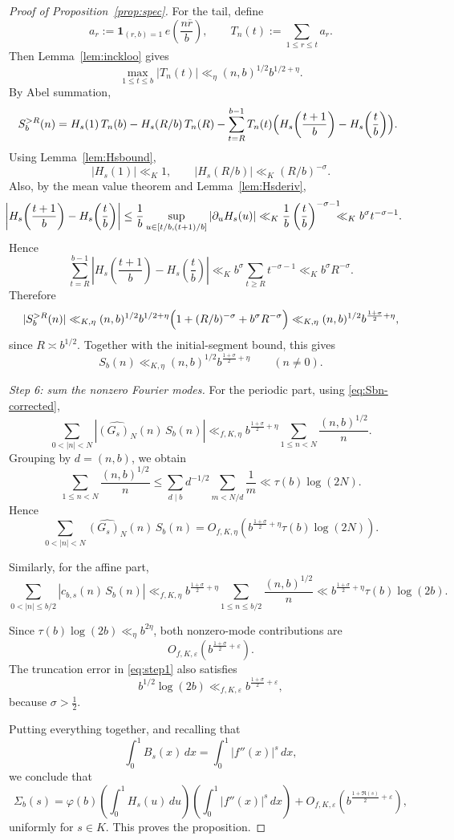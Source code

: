 \documentclass[a4paper,american,11pt]{amsart}
\theoremstyle{plain}
\theoremstyle{definition}
\newcommand{\ind}{\mathbf 1}
\begin{document}
\begin{proof}[Proof of Proposition~\ref{prop:spec}]
For the tail, define
\[
a_r:=\ind_{(r,b)=1}\,e\!\left(\frac{n\overline r}{b}\right),
\qquad
T_n(t):=\sum_{1\le r\le t} a_r.
\]
Then Lemma~\ref{lem:inckloo} gives
\[
\max_{1\le t\le b}|T_n(t)|
\ll_\eta (n,b)^{1/2}b^{1/2+\eta}.
\]
By Abel summation,
\[\mkern-10mu
S_b^{>R}(n)
=
H_s(1)\,T_n(b)-H_s(R/b)\,T_n(R)
-\sum_{t=R}^{b-1}T_n(t)\Bigl(H_s\!\left(\frac{t+1}{b}\right)-H_s\!\left(\frac{t}{b}\right)\Bigr).
\]
Using Lemma~\ref{lem:Hsbound},
\[
|H_s(1)|\ll_K1,
\qquad
|H_s(R/b)|\ll_K (R/b)^{-\sigma}.
\]
Also, by the mean value theorem and Lemma~\ref{lem:Hsderiv},
\[\mkern-22mu
\left|H_s\!\left(\frac{t+1}{b}\right)-H_s\!\left(\frac{t}{b}\right)\right|
\le
\frac1b\sup_{u\in[t/b,(t+1)/b]}|\partial_u H_s(u)|
\ll_K
\frac1b\left(\frac{t}{b}\right)^{-\sigma-1}
\mkern-12mu\ll_K b^\sigma t^{-\sigma-1}.
\]
Hence
\[
\sum_{t=R}^{b-1}
\left|H_s\!\left(\frac{t+1}{b}\right)-H_s\!\left(\frac{t}{b}\right)\right|
\ll_K
b^\sigma\sum_{t\ge R}t^{-\sigma-1}
\ll_K b^\sigma R^{-\sigma}.
\]
Therefore
\[
|S_b^{>R}(n)|
\ll_{K,\eta}
(n,b)^{1/2}b^{1/2+\eta}\Bigl(1+(R/b)^{-\sigma}+b^\sigma R^{-\sigma}\Bigr)
\ll_{K,\eta}
(n,b)^{1/2}b^{\frac{1+\sigma}{2}+\eta},
\]
since \(R\asymp b^{1/2}\). Together with the initial-segment bound, this gives
\begin{equation}
\label{eq:Sbn-corrected}
S_b(n)\ll_{K,\eta}(n,b)^{1/2}b^{\frac{1+\sigma}{2}+\eta}
\qquad (n\neq0).
\end{equation}

\emph{Step 6: sum the nonzero Fourier modes.}
For the periodic part, using \eqref{eq:Sbn-corrected},
\[
\sum_{0<|n|<N}|\widehat{(G_s)_N}(n)\,S_b(n)|
\ll_{f,K,\eta}
b^{\frac{1+\sigma}{2}+\eta}
\sum_{1\le n<N}\frac{(n,b)^{1/2}}{n}.
\]
Grouping by \(d=(n,b)\), we obtain
\[
\sum_{1\le n<N}\frac{(n,b)^{1/2}}{n}
\le
\sum_{d\mid b}d^{-1/2}\sum_{m<N/d}\frac1m
\ll
\tau(b)\log(2N).
\]
Hence
\[
\sum_{0<|n|<N}\widehat{(G_s)_N}(n)\,S_b(n)
=
O_{f,K,\eta}\!\left(
b^{\frac{1+\sigma}{2}+\eta}\tau(b)\log(2N)
\right).
\]

Similarly, for the affine part,
\[
\sum_{0<|n|\le b/2}|c_{b,s}(n)\,S_b(n)|
\ll_{f,K,\eta}
b^{\frac{1+\sigma}{2}+\eta}
\sum_{1\le n\le b/2}\frac{(n,b)^{1/2}}{n}
\ll
b^{\frac{1+\sigma}{2}+\eta}\tau(b)\log(2b).
\]

Since \(\tau(b)\log(2b)\ll_\eta b^{2\eta}\), both nonzero-mode contributions are
\[
O_{f,K,\varepsilon}\!\left(b^{\frac{1+\sigma}{2}+\varepsilon}\right).
\]
The truncation error in \eqref{eq:step1} also satisfies
\[
b^{1/2}\log(2b)\ll_{f,K,\varepsilon} b^{\frac{1+\sigma}{2}+\varepsilon},
\]
because \(\sigma>\tfrac12\).

Putting everything together, and recalling that
\[
\int_0^1 B_s(x)\,dx=\int_0^1 |f''(x)|^s\,dx,
\]
we conclude that
\[
\Sigma_b(s)
=
\varphi(b)\left(\int_0^1 H_s(u)\,du\right)\left(\int_0^1 |f''(x)|^s\,dx\right)
+
O_{f,K,\varepsilon}\!\left(b^{\frac{1+\Re(s)}{2}+\varepsilon}\right),
\]
uniformly for \(s\in K\). This proves the proposition.
\end{proof}
\end{document}
